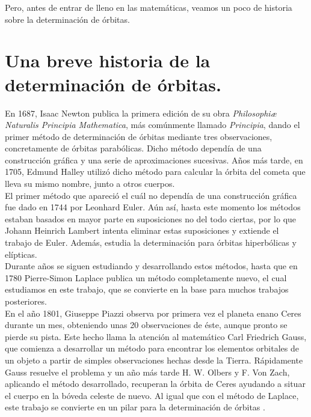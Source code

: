 \documentclass[11pt]{book}
\begin{document}
Pero, antes de entrar de lleno en las matemáticas, veamos un poco de historia sobre la determinación de órbitas.\\


\section{Una breve historia de la determinación de órbitas.}
\label{sec:history}
En 1687, Isaac Newton publica la primera edición de su obra \textit{Philosophiæ Naturalis Principia Mathematica}, más comúnmente llamado \textit{Principia}, dando el primer método de determinación de órbitas mediante tres observaciones, concretamente de órbitas parabólicas. Dicho método dependía de una construcción gráfica y una serie de aproximaciones sucesivas. Años más tarde, en 1705, Edmund Halley utilizó dicho método para calcular la órbita del cometa que lleva su mismo nombre, junto a otros cuerpos.\\

El primer método que apareció el cuál no dependía de una construcción gráfica fue dado en 1744 por Leonhard Euler. Aún así, hasta este momento los métodos estaban basados en mayor parte en suposiciones no del todo ciertas, por lo que Johann Heinrich Lambert intenta eliminar estas suposiciones y extiende el trabajo de Euler. Además, estudia la determinación para órbitas hiperbólicas y elípticas.\\

Durante años se siguen estudiando y desarrollando estos métodos, hasta que en 1780 Pierre-Simon Laplace publica un método completamente nuevo, el cual estudiamos en este trabajo, que se convierte en la base para muchos trabajos posteriores.\\

En el año 1801, Giuseppe Piazzi observa por primera vez el planeta enano Ceres durante un mes, obteniendo unas 20 observaciones de éste, aunque pronto se pierde su pista. Este hecho llama la atención al matemático Carl Friedrich Gauss, que comienza a desarrollar un método para encontrar los elementos orbitales de un objeto a partir de simples observaciones hechas desde la Tierra. Rápidamente Gauss resuelve el problema y un año más tarde H. W. Olbers y F. Von Zach, aplicando el método desarrollado, recuperan la órbita de Ceres ayudando a situar el cuerpo en la bóveda celeste de nuevo. Al igual que con el método de Laplace, este trabajo se convierte en un pilar para la determinación de órbitas \cite{moulton}.\\
\end{document}
